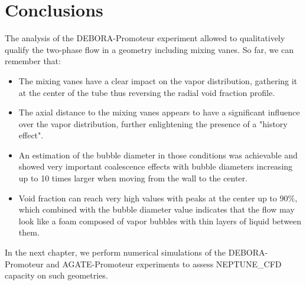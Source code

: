 

\section{Conclusions}

The analysis of the DEBORA-Promoteur experiment allowed to qualitatively qualify the two-phase flow in a geometry including mixing vanes. So far, we can remember that:

\begin{itemize}
\item The mixing vanes have a clear impact on the vapor distribution, gathering it at the center of the tube thus reversing the radial void fraction profile.

\item The axial distance to the mixing vanes appears to have a significant influence over the vapor distribution, further enlightening the presence of a "history effect". 

\item An estimation of the bubble diameter in those conditions was achievable and showed very important coalescence effects with bubble diameters increasing up to 10 times larger when moving from the wall to the center.

\item Void fraction can reach very high values with peaks at the center up to $90\%$, which combined with the bubble diameter value indicates that the flow may look like a foam composed of vapor bubbles with thin layers of liquid between them.
\end{itemize}


In the next chapter, we perform numerical simulations of the DEBORA-Promoteur and AGATE-Promoteur experiments to assess NEPTUNE\_CFD capacity on such geometries.